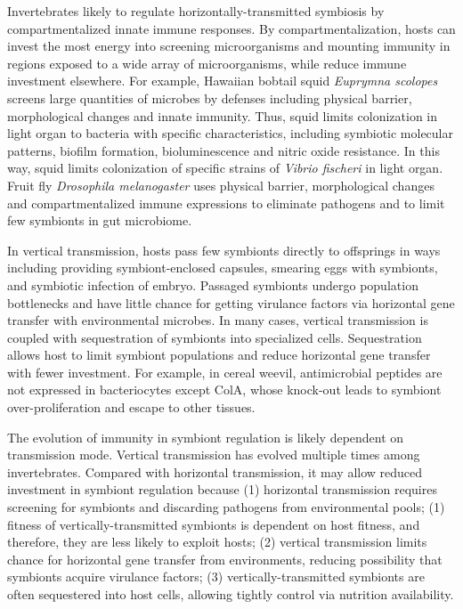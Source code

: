 \documentclass[11pt]{article}
\begin{document}
\begin{sloppypar}
Invertebrates likely to regulate horizontally-transmitted symbiosis by compartmentalized innate immune responses. 
By compartmentalization, hosts can invest the most energy into screening microorganisms and mounting immunity in regions exposed to a wide array of microorganisms, while reduce immune investment elsewhere. 
For example, Hawaiian bobtail squid \textit{Euprymna scolopes} screens large quantities of microbes by defenses including physical barrier, morphological changes and innate immunity. 
Thus, squid limits colonization in light organ to bacteria with specific characteristics, including symbiotic molecular patterns, biofilm formation, bioluminescence and nitric oxide resistance. 
In this way, squid limits colonization of specific strains of \textit{Vibrio fischeri} in light organ. 
Fruit fly \textit{Drosophila melanogaster} uses physical barrier, morphological changes and compartmentalized immune expressions to eliminate pathogens and to limit few symbionts in gut microbiome. 
\par
In vertical transmission, hosts pass few symbionts directly to offsprings in ways including providing symbiont-enclosed capsules, smearing eggs with symbionts, and symbiotic infection of embryo. 
Passaged symbionts undergo population bottlenecks and have little chance for getting virulance factors via horizontal gene transfer with environmental microbes. 
In many cases, vertical transmission is coupled with sequestration of symbionts into specialized cells. 
Sequestration allows host to limit symbiont populations and reduce horizontal gene transfer with fewer investment. 
For example, in cereal weevil, antimicrobial peptides are not expressed in bacteriocytes except ColA, whose knock-out leads to symbiont over-proliferation and escape to other tissues. 
\par
The evolution of immunity in symbiont regulation is likely dependent on transmission mode. 
Vertical transmission has evolved multiple times among invertebrates. 
Compared with horizontal transmission, it may allow reduced investment in symbiont regulation because 
(1) horizontal transmission requires screening for symbionts and discarding pathogens from environmental pools; 
(1) fitness of vertically-transmitted symbionts is dependent on host fitness, and therefore, they are less likely to exploit hosts; 
(2) vertical transmission limits chance for horizontal gene transfer from environments, reducing possibility that symbionts acquire virulance factors; 
(3) vertically-transmitted symbionts are often sequestered into host cells, allowing tightly control via nutrition availability. 

\end{sloppypar}
\end{document}
